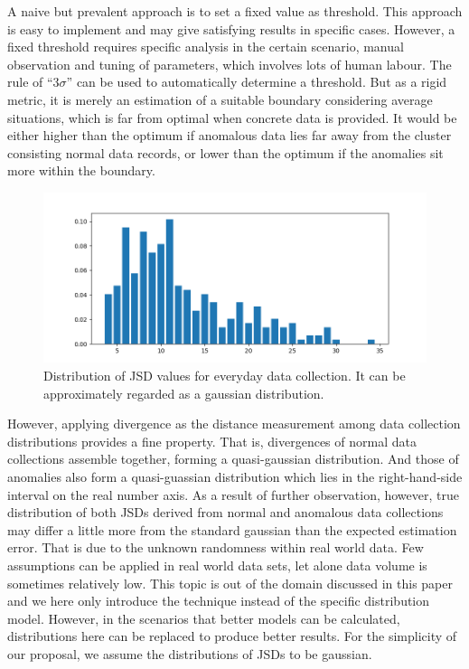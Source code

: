 \documentclass[10pt,conference,letterpaper]{IEEEtran}
\begin{document}
			A naive but prevalent approach is to set a fixed value as threshold. This approach is easy to implement and may give satisfying results in specific cases. However, a fixed threshold requires specific analysis in the certain scenario, manual observation and tuning of parameters, which involves lots of human labour. The rule of ``$3 \sigma$'' can be used to automatically determine a threshold. But as a rigid metric, it is merely an estimation of a suitable boundary considering average situations, which is far from optimal when concrete data is provided. It would be either higher than the optimum if anomalous data lies far away from the cluster consisting normal data records, or lower than the optimum if the anomalies sit more within the boundary.
	
			\begin{figure}[!t]
				\centering
				\includegraphics[width=\linewidth]{fig/JSD-Dist.png}
				\caption{Distribution of JSD values for everyday data collection. It can be approximately regarded as a gaussian distribution.}
			\end{figure}
	
			However, applying divergence as the distance measurement among data collection distributions provides a fine property. That is, divergences of normal data collections assemble together, forming a quasi-gaussian distribution. And those of anomalies also form a quasi-guassian distribution which lies in the right-hand-side interval on the real number axis. As a result of further observation, however, true distribution of both JSDs derived from normal and anomalous data collections may differ a little more from the standard gaussian than the expected estimation error. That is due to the unknown randomness within real world data. Few assumptions can be applied in real world data sets, let alone data volume is sometimes relatively low. This topic is out of the domain discussed in this paper and we here only introduce the technique instead of the specific distribution model. However, in the scenarios that better models can be calculated, distributions here can be replaced to produce better results. For the simplicity of our proposal, we assume the distributions of JSDs to be gaussian.
	
\end{document}
